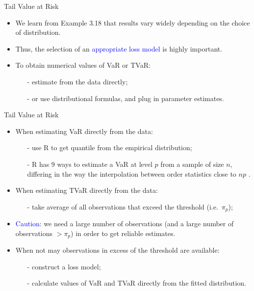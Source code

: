 \documentclass{beamer}
\begin{document}
\begin{frame}{Tail Value at Risk}
\begin{itemize}
\item We learn from Example 3.18 that results vary widely depending on the choice of distribution.
\vspace{0.3cm}
\item Thus, the selection of an \textcolor{blue}{appropriate loss model} is highly important.
\vspace{0.3cm}
\item To obtain numerical values of VaR or TVaR:
\vspace{0.3cm}
\begin{itemize}
\item[-] estimate from the data directly;
\vspace{0.3cm}
\item[-] or use distributional formulas, and plug in parameter estimates.
\end{itemize}
\end{itemize}
\end{frame}

\begin{frame}{Tail Value at Risk}
\begin{itemize}
\item When estimating VaR directly from the data:
\vspace{0.3cm}
\begin{itemize}
\item[-] use R to get quantile from the empirical distribution;
\vspace{0.3cm}
\item[-] R has 9 ways to estimate a VaR at level $p$ from a sample of size $n$, differing in the way the interpolation between order statistics close to $np$ .
\end{itemize}
\vspace{0.3cm}
\item When estimating TVaR directly from the data:
\vspace{0.3cm}
\begin{itemize}
\item[-] take average of all observations that exceed the threshold (i.e.\ $\pi_p$);
\end{itemize}
\vspace{0.3cm}
\item \textcolor{blue}{Caution:} we need a large number of observations (and a large number of observations $> \pi_p$) in order to get reliable estimates.
\vspace{0.3cm}
\item When not may observations in excess of the threshold are available:
\vspace{0.3cm}
\begin{itemize}
\item[-] construct a loss model;
\vspace{0.3cm}
\item[-] calculate values of VaR and TVaR directly from the fitted distribution.
\end{itemize}
\end{itemize}
\end{frame}
\end{document}
